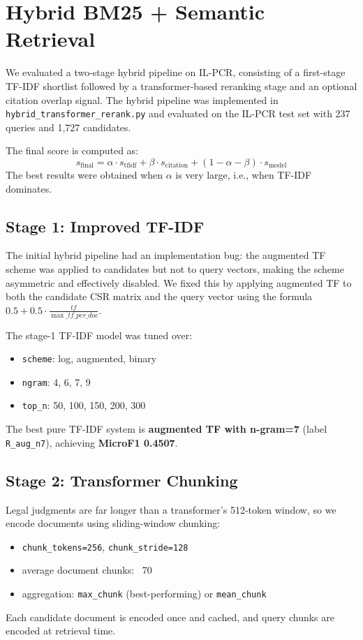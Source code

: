 \documentclass[11pt]{article}
\begin{document}
\section{Hybrid BM25 + Semantic Retrieval}

We evaluated a two-stage hybrid pipeline on IL-PCR, consisting of a first-stage TF-IDF shortlist followed by a transformer-based reranking stage and an optional citation overlap signal.
The hybrid pipeline was implemented in \texttt{hybrid\_transformer\_rerank.py} and evaluated on the IL-PCR test set with 237 queries and 1,727 candidates.

The final score is computed as:
\begin{equation}
    s_{\text{final}} = \alpha \cdot s_{\text{tfidf}} + \beta \cdot s_{\text{citation}} + (1-\alpha-\beta) \cdot s_{\text{model}}
\end{equation}
The best results were obtained when $\alpha$ is very large, i.e., when TF-IDF dominates.

\subsection{Stage 1: Improved TF-IDF}
The initial hybrid pipeline had an implementation bug: the augmented TF scheme was applied to candidates but not to query vectors, making the scheme asymmetric and effectively disabled.
We fixed this by applying augmented TF to both the candidate CSR matrix and the query vector using the formula
$0.5 + 0.5 \cdot \frac{tf}{\max\_tf\_per\_doc}$.

The stage-1 TF-IDF model was tuned over:
\begin{itemize}
    \item \texttt{scheme}: log, augmented, binary
    \item \texttt{ngram}: 4, 6, 7, 9
    \item \texttt{top\_n}: 50, 100, 150, 200, 300
\end{itemize}
The best pure TF-IDF system is \textbf{augmented TF with n-gram=7} (label \texttt{R\_aug\_n7}), achieving \textbf{MicroF1 0.4507}.

\subsection{Stage 2: Transformer Chunking}
Legal judgments are far longer than a transformer's 512-token window, so we encode documents using sliding-window chunking:
\begin{itemize}
    \item \texttt{chunk\_tokens=256}, \texttt{chunk\_stride=128}
    \item average document chunks: ~70
    \item aggregation: \texttt{max\_chunk} (best-performing) or \texttt{mean\_chunk}
\end{itemize}
Each candidate document is encoded once and cached, and query chunks are encoded at retrieval time.
\end{document}
